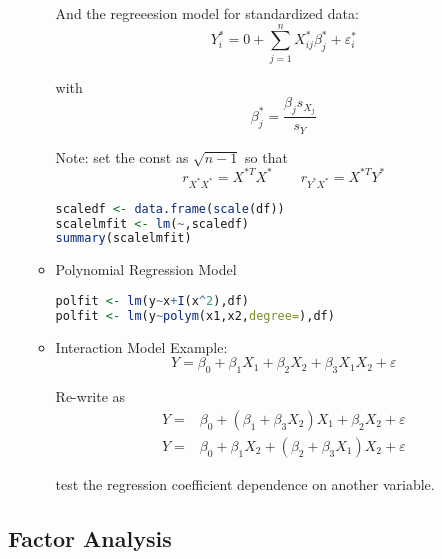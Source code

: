 \begin{itemize}[topsep=2pt,itemsep=0pt]
\begin{itemize}[topsep=2pt,itemsep=0pt]
And the regreeesion model for standardized data:
\begin{equation}
    Y^*_i=0+\sum_{j=1}^nX_{ij}^*\beta _j^*+\varepsilon _i^* 
\end{equation}

with
\begin{equation}
    \beta _j^*=\dfrac{\beta _js_{X_j}}{s_Y} 
\end{equation}

Note: set the const as $ \sqrt{n-1} $ so that 
\begin{equation}
    r_{X^*X^*}=X^{*T}X^* \qquad r_{Y^*X^*}=X^{*T}Y^*
\end{equation}
\begin{rcode}
\begin{lstlisting}[language=R]
scaledf <- data.frame(scale(df))
scalelmfit <- lm(~,scaledf)
summary(scalelmfit)
\end{lstlisting}
\end{rcode}
    \item Polynomial Regression Model

\begin{rcode}
\begin{lstlisting}[language=R]
polfit <- lm(y~x+I(x^2),df)
polfit <- lm(y~polym(x1,x2,degree=),df)
\end{lstlisting}
\end{rcode}
    
    \item Interaction Model
    Example: 
    \[
        Y=\beta _0+\beta _1X_1+\beta _2X_2+\beta _{3}X_1X_2+\varepsilon  
    \]
    
    Re-write as
    \begin{align*}
        Y=&\beta _0+(\beta _1+\beta _3X_2)X_1+\beta _2X_2+\varepsilon \\
        Y=&\beta _0+\beta _1X_2+(\beta _2+\beta _3X_1)X_2+\varepsilon 
    \end{align*}

    test the regression coefficient dependence on another variable.

\end{itemize}
   
      
\end{itemize}





\subsection{Factor Analysis}




